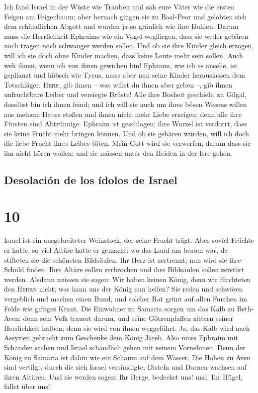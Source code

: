  Ich fand Israel in der Wüste wie Trauben und sah eure
Väter wie die ersten Feigen am Feigenbaum; aber hernach gingen sie zu
Baal-Peor und gelobten sich dem schändlichen Abgott und wurden ja so
gräulich wie ihre Buhlen.  Darum muss die Herrlichkeit
Ephraims wie ein Vogel wegfliegen, dass sie weder gebären noch tragen
noch schwanger werden sollen.  Und ob sie ihre Kinder
gleich erzögen, will ich sie doch ohne Kinder machen, dass keine Leute
mehr sein sollen. Auch weh ihnen, wenn ich von ihnen gewichen bin!
 Ephraim, wie ich es ansehe, ist gepflanzt und hübsch wie
Tyrus, muss aber nun seine Kinder herauslassen dem Totschläger.
 \textsc{Herr}, gib ihnen -- was willst du ihnen aber
geben --, gib ihnen unfruchtbare Leiber und versiegte Brüste!
 Alle ihre Bosheit geschieht zu Gilgal, daselbst bin ich
ihnen feind; und ich will sie auch um ihres bösen Wesens willen aus
meinem Hause stoßen und ihnen nicht mehr Liebe erzeigen; denn alle ihre
Fürsten sind Abtrünnige.  Ephraim ist geschlagen; ihre
Wurzel ist verdorrt, dass sie keine Frucht mehr bringen können. Und ob
sie gebären würden, will ich doch die liebe Frucht ihres Leibes töten.
 Mein Gott wird sie verwerfen, darum dass sie ihn nicht
hören wollen; und sie müssen unter den Heiden in der Irre gehen.

\hypertarget{desolaciuxf3n-de-los-uxeddolos-de-israel}{%
\subsection{Desolación de los ídolos de
Israel}\label{desolaciuxf3n-de-los-uxeddolos-de-israel}}

\hypertarget{section-9}{%
\section{10}\label{section-9}}

 Israel ist ein ausgebreiteter Weinstock, der seine Frucht
trägt. Aber soviel Früchte er hatte, so viel Altäre hatte er gemacht; wo
das Land am besten war, da stifteten sie die schönsten Bildsäulen.
 Ihr Herz ist zertrennt; nun wird sie ihre Schuld finden.
Ihre Altäre sollen zerbrochen und ihre Bildsäulen sollen zerstört
werden.  Alsdann müssen sie sagen: Wir haben keinen König,
denn wir fürchteten den \textsc{Herrn} nicht; was kann uns der König nun
helfen?  Sie reden und schwören vergeblich und machen
einen Bund, und solcher Rat grünt auf allen Furchen im Felde wie
giftiges Kraut.  Die Einwohner zu Samaria sorgen um das
Kalb zu Beth-Aven; denn sein Volk trauert darum, und seine Götzenpfaffen
zittern seiner Herrlichkeit halben; denn sie wird von ihnen weggeführt.
 Ja, das Kalb wird nach Assyrien gebracht zum Geschenke
dem König Jareb. Also muss Ephraim mit Schanden stehen und Israel
schändlich gehen mit seinem Vornehmen.  Denn der König zu
Samaria ist dahin wie ein Schaum auf dem Wasser.  Die
Höhen zu Aven sind vertilgt, durch die sich Israel versündigte; Disteln
und Dornen wachsen auf ihren Altären. Und sie werden sagen: Ihr Berge,
bedecket uns! und: Ihr Hügel, fallet über uns!

